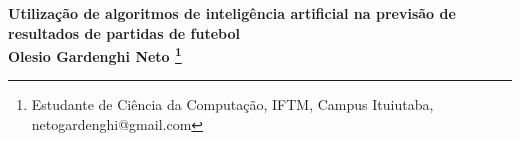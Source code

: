 \begin{center}
\textbf{Utilização de algoritmos de inteligência artificial na previsão de resultados de partidas de futebol\\
Olesio Gardenghi Neto
\footnote[1]{Estudante de Ciência da Computação, IFTM, Campus Ituiutaba, netogardenghi@gmail.com}}
\end{center}